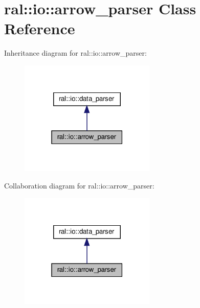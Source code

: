 \hypertarget{classral_1_1io_1_1arrow__parser}{}\section{ral\+:\+:io\+:\+:arrow\+\_\+parser Class Reference}
\label{classral_1_1io_1_1arrow__parser}


Inheritance diagram for ral\+:\+:io\+:\+:arrow\+\_\+parser\+:\nopagebreak
\begin{figure}[H]
\begin{center}
\leavevmode
\includegraphics[width=183pt]{classral_1_1io_1_1arrow__parser__inherit__graph}
\end{center}
\end{figure}


Collaboration diagram for ral\+:\+:io\+:\+:arrow\+\_\+parser\+:\nopagebreak
\begin{figure}[H]
\begin{center}
\leavevmode
\includegraphics[width=183pt]{classral_1_1io_1_1arrow__parser__coll__graph}
\end{center}
\end{figure}
